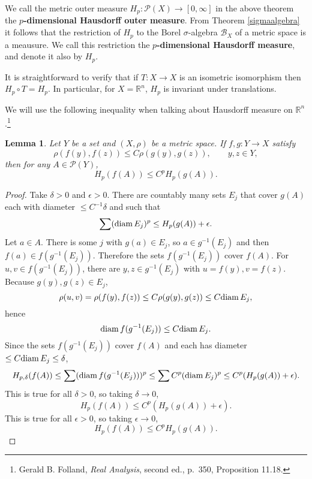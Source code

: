 \documentclass{article}
\newcommand{\diam}{\ensuremath\mathrm{diam}\,}
\newtheorem{lemma}[theorem]{Lemma}
\theoremstyle{definition}
\begin{document}
We call the metric outer measure $H_p:\mathscr{P}(X) \to [0,\infty]$ in the above theorem the \textbf{$p$-dimensional Hausdorff outer measure}.
From Theorem \ref{sigmaalgebra} it follows that the restriction of $H_p$ to the Borel $\sigma$-algebra $\mathscr{B}_X$ of a metric space is a meausure. We call
this restriction the \textbf{$p$-dimensional Hausdorff measure}, and denote it also by $H_p$. 

It is straightforward to verify that 
if $T:X \to X$ is an isometric isomorphism then $H_p \circ T=H_p$. 
In particular, for $X=\mathbb{R}^n$, $H_p$ is invariant under translations. 

We will use the following inequality when talking about Hausdorff measure on $\mathbb{R}^n$.\footnote{Gerald B. Folland, {\em Real Analysis}, second ed., p.~350,
Proposition 11.18.}

\begin{lemma}
Let $Y$ be a set and $(X,\rho)$ be a metric space. If $f,g:Y \to X$ satisfy
\[
\rho(f(y),f(z)) \leq C \rho(g(y),g(z)), \qquad y,z \in Y,
\]
then for any $A \in \mathscr{P}(Y)$,
\[
H_p(f(A)) \leq C^p H_p(g(A)).
\]
\label{dilation}
\end{lemma}
\begin{proof}
Take $\delta>0$ and $\epsilon>0$. There are countably many sets $E_j$ that cover $g(A)$ each with diameter $\leq C^{-1}\delta$ and such that
\[
\sum (\diam E_j)^p \leq H_p(g(A))+\epsilon.
\]
Let $a \in A$. There is some $j$ with $g(a) \in E_j$, so $a \in g^{-1}(E_j)$ and then $f(a) \in f(g^{-1}(E_j))$. Therefore
the sets $f(g^{-1}(E_j))$ cover $f(A)$. For $u,v \in f(g^{-1}(E_j))$, there are $y,z \in g^{-1}(E_j)$ with
$u=f(y), v=f(z)$. Because $g(y),g(z) \in E_j$,
\[
\rho(u,v) = \rho(f(y),f(z)) \leq C \rho(g(y),g(z)) \leq C \diam E_j,
\]
hence
\[
\diam f(g^{-1}(E_j)) \leq C \diam E_j.
\]
Since the sets $f(g^{-1}(E_j))$ cover $f(A)$ and each has diameter $\leq C \diam E_j \leq \delta$, 
\[
H_{p,\delta}(f(A)) \leq \sum (\diam f(g^{-1}(E_j)))^p
\leq \sum C^p (\diam E_j)^p
\leq C^p (H_p(g(A))+\epsilon).
\]
This is true for all $\delta>0$, so taking $\delta \to 0$,
\[
H_p(f(A)) \leq C^p(H_p(g(A))+\epsilon).
\]
This is true for all $\epsilon>0$, so taking $\epsilon \to 0$,
\[
H_p(f(A)) \leq C^p H_p(g(A)).
\]
\end{proof}
\end{document}
